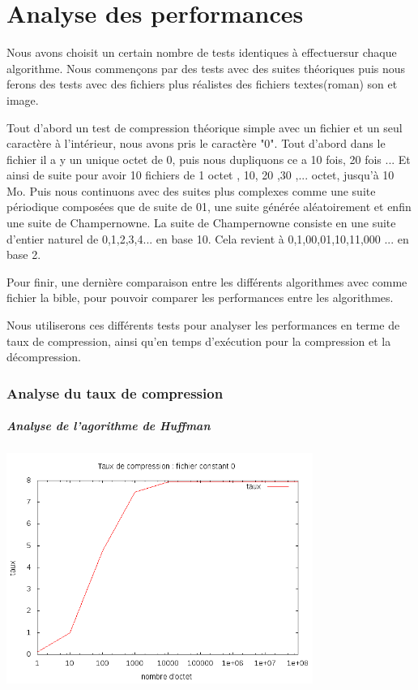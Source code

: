 \documentclass{report}
\begin{document}
\part*{Analyse des performances}
Nous avons choisit un certain nombre de tests identiques à effectuersur chaque algorithme. Nous commençons par des tests avec des suites théoriques puis nous ferons des tests avec des fichiers plus réalistes des fichiers textes(roman) son et image.
 
Tout d'abord un test de compression théorique simple avec un fichier et un seul caractère à l'intérieur, nous avons pris le caractère "0".
Tout d'abord dans le fichier il a y un unique octet de 0, puis nous dupliquons ce a 10 fois, 20 fois ... Et ainsi de suite pour avoir 10 fichiers de 1 octet , 10, 20 ,30 ,...  octet, jusqu'à 10 Mo.
Puis nous continuons avec des suites plus complexes comme une suite périodique composées que de suite de 01, une suite générée aléatoirement et enfin une suite de Champernowne.
La suite de Champernowne consiste en une suite d'entier naturel de 0,1,2,3,4... en base 10. Cela revient à 0,1,00,01,10,11,000 ... en base 2.   

Pour finir, une dernière comparaison entre les différents algorithmes avec comme fichier la bible, pour pouvoir comparer les performances entre les algorithmes.

Nous utiliserons ces différents tests pour analyser les performances en terme de taux de compression, ainsi qu'en temps d’exécution pour la compression et la décompression. 
\section*{Analyse du taux de compression}
\subsubsection{ Analyse de l'agorithme de Huffman}

\begin{center}
\includegraphics[width=10cm]{HConstant.png}
\end{center}
\end{document}
